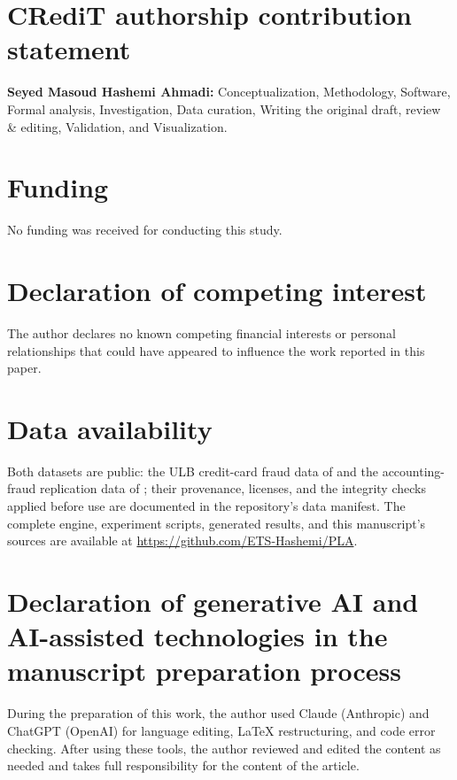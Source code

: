 \documentclass[review,12pt]{elsarticle}
\begin{document}










\section*{CRediT authorship contribution statement}
\textbf{Seyed Masoud Hashemi Ahmadi:} Conceptualization, Methodology,
Software, Formal analysis, Investigation, Data curation,
Writing the original draft, review \& editing, Validation, and Visualization.


\section*{Funding}
No funding was received for conducting this study.

\section*{Declaration of competing interest}
The author declares no known competing financial interests or personal
relationships that could have appeared to influence the work reported
in this paper.

\section*{Data availability}
Both datasets are public: the ULB credit-card fraud data of
\cite{dalpozzolo2015} and the accounting-fraud replication data of
\cite{bao2020}; their provenance, licenses, and the integrity checks
applied before use are documented in the repository's data manifest.
The complete engine, experiment scripts, generated results, and this
manuscript's sources are available at
\url{https://github.com/ETS-Hashemi/PLA}. 
\section*{Declaration of generative AI and AI-assisted technologies in the manuscript preparation process}
During the preparation of this work, the author used Claude (Anthropic) and ChatGPT (OpenAI) for language editing, LaTeX restructuring, and code error checking. After using these tools, the author reviewed and edited the content as needed and takes full responsibility for the content of the article.




\appendix

\end{document}
